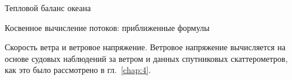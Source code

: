\begin{chapter}{Тепловой баланс океана}
\begin{section}{Косвенное вычисление потоков: приближенные формулы}

\begin{paragraph}{Скорость ветра и ветровое напряжение.}
Ветровое напряжение вычисляется на основе судовых наблюдений за ветром
и данных спутниковых скаттерометров, как это было рассмотрено 
в гл.~\ref{chap:4}.
%
\end{paragraph}


\end{section}
\end{chapter}
